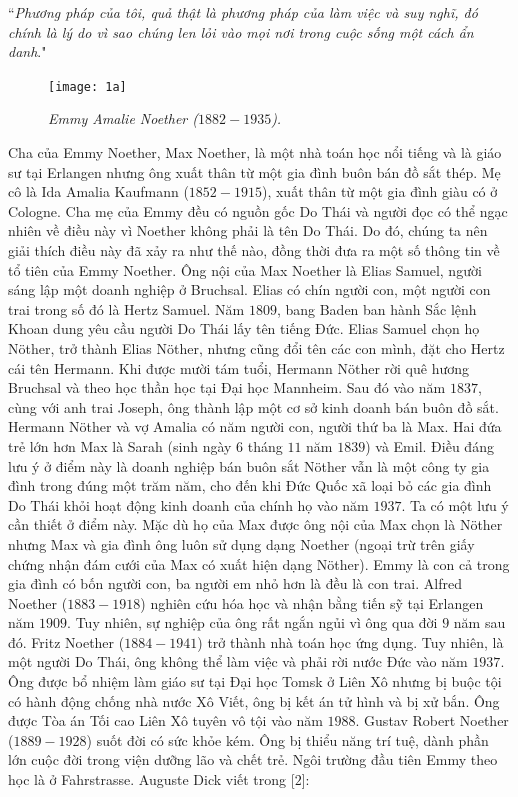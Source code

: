 \vspace*{160pt}

	``\textit{Phương pháp của tôi, quả thật là phương pháp của làm việc và suy nghĩ, 
	đó chính là lý do vì sao chúng len lỏi vào mọi nơi trong cuộc sống một cách ẩn danh}."
\begin{multicols}{2}
		\begin{figure}[H]
		\centering
		\captionsetup{labelformat= empty, justification=centering}
		\texttt{[image: 1a]}
		\caption{\small\textit{\color{lichsutoanhoc}Emmy Amalie Noether ($1882-1935$).}}
		\vspace*{-10pt}
	\end{figure}
	Cha của Emmy Noether, Max Noether, là một nhà toán học nổi tiếng và là giáo sư tại Erlangen nhưng ông xuất thân từ một gia đình buôn bán đồ sắt thép. Mẹ cô là Ida Amalia Kaufmann ($1852-1915$), xuất thân từ một gia đình giàu có ở Cologne. Cha mẹ của Emmy đều có nguồn gốc Do Thái và người đọc có thể ngạc nhiên về điều này vì Noether không phải là tên Do Thái. Do đó, chúng ta nên giải thích điều này đã xảy ra như thế nào, đồng thời đưa ra một số thông tin về tổ tiên của Emmy Noether. Ông nội của Max Noether là Elias Samuel, người sáng lập một doanh nghiệp ở Bruchsal. Elias có chín người con,  một người con trai trong số đó là  Hertz Samuel. Năm $1809$, bang Baden ban hành Sắc lệnh Khoan dung yêu cầu người Do Thái lấy tên tiếng Đức. Elias Samuel chọn họ Nöther, trở thành Elias Nöther, nhưng cũng đổi tên các con mình, đặt cho Hertz cái tên Hermann. Khi được mười tám tuổi, Hermann Nöther rời quê hương Bruchsal và theo học thần học tại Đại học Mannheim. Sau đó vào năm $1837$, cùng với anh trai Joseph, ông thành lập một cơ sở kinh doanh bán buôn đồ sắt. Hermann Nöther và vợ Amalia có năm người con, người thứ ba là Max. Hai đứa trẻ lớn hơn Max là Sarah (sinh ngày $6$ tháng $11$ năm $1839$) và Emil. Điều đáng lưu ý ở điểm này là doanh nghiệp bán buôn sắt Nöther vẫn là một công ty gia đình trong đúng một trăm năm, cho đến khi Đức Quốc xã loại bỏ các gia đình Do Thái khỏi hoạt động kinh doanh của chính họ vào năm $1937$. Ta có một lưu ý cần thiết ở điểm này. Mặc dù họ của Max được ông nội của Max chọn là Nöther nhưng Max và gia đình ông  luôn sử dụng dạng Noether (ngoại trừ trên giấy chứng nhận đám cưới của Max có xuất hiện dạng Nöther).
	\vskip 0.05cm
	Emmy là con cả trong gia đình có bốn người con, ba người em nhỏ hơn là đều là con trai. Alfred Noether ($1883-1918$) nghiên cứu hóa học và nhận bằng tiến sỹ tại Erlangen năm $1909$. Tuy nhiên, sự nghiệp của ông rất ngắn ngủi vì ông qua đời $9$ năm sau đó. Fritz Noether ($1884-1941$) trở thành nhà toán học ứng dụng. Tuy nhiên, là một người Do Thái, ông không thể làm việc và phải rời nước Đức vào năm $1937$. Ông được bổ nhiệm làm giáo sư tại Đại học Tomsk ở Liên Xô nhưng bị buộc tội có hành động chống nhà nước  Xô Viết, ông bị kết án tử hình và bị xử bắn. Ông được Tòa án Tối cao Liên Xô tuyên vô tội vào năm $1988$. Gustav Robert Noether ($1889-1928$) suốt đời có sức khỏe kém. Ông bị thiểu năng trí tuệ, dành phần lớn cuộc đời trong viện dưỡng lão và chết trẻ. Ngôi trường đầu tiên Emmy theo học là ở Fahrstrasse. Auguste Dick viết trong [$2$]:

\end{multicols}
